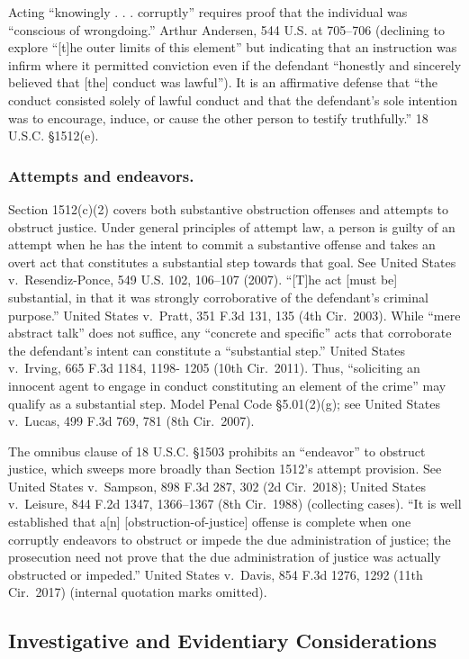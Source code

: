 Acting “knowingly . . . corruptly” requires proof that the individual was “conscious of wrongdoing.”
Arthur Andersen, 544 U.S. at 705--706 (declining to explore “[t]he outer limits of this element” but indicating that an instruction was infirm where it permitted conviction even if the defendant “honestly and sincerely believed that [the] conduct was lawful”).
It is an affirmative defense that “the conduct consisted solely of lawful conduct and that the defendant’s sole intention was to encourage, induce, or cause the other person to testify truthfully.”
18 U.S.C. \S 1512(e).

\subsubsection*{Attempts and endeavors.}
Section 1512(c)(2) covers both substantive obstruction offenses and attempts to obstruct justice. Under general principles of attempt law, a person is guilty of an attempt when he has the intent to commit a substantive offense and takes an overt act that constitutes a substantial step towards that goal.
See United States v.\ Resendiz-Ponce, 549 U.S. 102, 106--107 (2007).
“[T]he act [must be] substantial, in that it was strongly corroborative of the defendant’s criminal purpose.”
United States v.\ Pratt, 351 F.3d 131, 135 (4th Cir.~2003).
While “mere abstract talk” does not suffice, any “concrete and specific” acts that corroborate the defendant’s intent can constitute a “substantial step.”
United States v.\ Irving, 665 F.3d 1184, 1198- 1205 (10th Cir.~2011).
Thus, “soliciting an innocent agent to engage in conduct constituting an element of the crime” may qualify as a substantial step.
Model Penal Code \S 5.01(2)(g);
see United States v.\ Lucas, 499 F.3d 769, 781 (8th Cir.~2007).

The omnibus clause of 18 U.S.C. \S 1503 prohibits an “endeavor” to obstruct justice, which sweeps more broadly than Section 1512’s attempt provision.
See United States v.\ Sampson, 898 F.3d 287, 302 (2d Cir.~2018);
United States v.\ Leisure, 844 F.2d 1347, 1366--1367 (8th Cir.~1988) (collecting cases).
“It is well established that a[n] [obstruction-of-justice] offense is complete when one corruptly endeavors to obstruct or impede the due administration of justice;
the prosecution need not prove that the due administration of justice was actually obstructed or impeded.”
United States v.\ Davis, 854 F.3d 1276, 1292 (11th Cir.~2017) (internal quotation marks omitted).

\subsection{Investigative and Evidentiary Considerations}


